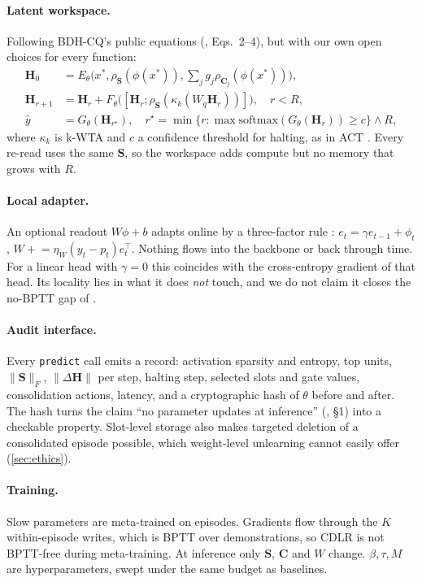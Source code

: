 \documentclass[11pt]{article}
\theoremstyle{remark}
\newcommand{\Sm}{\mathbf{S}}
\newcommand{\Cm}{\mathbf{C}}
\newcommand{\Hm}{\mathbf{H}}
\newcommand{\cdlr}{\textsc{CDLR}}
\begin{document}
\paragraph{Latent workspace.} Following BDH-CQ's public equations (\citealp{engdahl2026bdhcq}, Eqs.~2--4), but
with our own open choices for every function:
\begin{align}
\Hm_0&=E_\theta\big(x^*,\rho_\Sm(\phi(x^*)),\textstyle\sum_jg_j\rho_{\Cm_j}(\phi(x^*))\big),\\
\Hm_{r+1}&=\Hm_r+F_\theta\big([\Hm_r;\rho_\Sm(\kappa_k(W_q\Hm_r))]\big),\quad r<R,\\
\hat y&=G_\theta(\Hm_{r^\star}),\quad r^\star=\min\{r:\max\mathrm{softmax}(G_\theta(\Hm_r))\ge c\}\wedge R,
\end{align}
where $\kappa_k$ is k-WTA and $c$ a confidence threshold for halting, as in ACT \citep{graves2016act}. Every
re-read uses the same $\Sm$, so the workspace adds compute but no memory that grows with $R$.

\paragraph{Local adapter.} An optional readout $W\phi+b$ adapts online by a three-factor rule
\citep{gerstner2018eligibility}: $e_t=\gamma e_{t-1}+\phi_t$, $W\mathrel{+}=\eta_W(y_t-p_t)e_t^\top$. Nothing flows
into the backbone or back through time. For a linear head with $\gamma=0$ this coincides with the cross-entropy
gradient of that head. Its locality lies in what it does \emph{not} touch, and we do not claim it closes the
no-BPTT gap of \citet[\S7.2]{kosowski2025bdh}.

\paragraph{Audit interface.} Every \texttt{predict} call emits a record: activation sparsity and entropy, top
units, $\|\Sm\|_F$, $\|\Delta\Hm\|$ per step, halting step, selected slots and gate values, consolidation actions,
latency, and a cryptographic hash of $\theta$ before and after. The hash turns the claim ``no parameter updates at
inference'' (\citealp{engdahl2026bdhcq}, \S1) into a checkable property. Slot-level storage also makes targeted
deletion of a consolidated episode possible, which weight-level unlearning cannot easily offer (\cref{sec:ethics}).

\paragraph{Training.} Slow parameters are meta-trained on episodes. Gradients flow through the $K$ within-episode
writes, which is BPTT over demonstrations, so \cdlr{} is not BPTT-free during meta-training. At inference only
$\Sm$, $\Cm$ and $W$ change. $\beta,\tau,M$ are hyperparameters, swept under the same budget as baselines.
\end{document}
